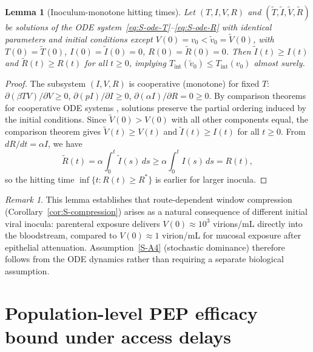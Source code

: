 \documentclass[12pt,a4paper]{article}
\theoremstyle{plain}
\newtheorem{lemma}{Lemma}
\theoremstyle{definition}
\theoremstyle{remark}
\newtheorem{remark}{Remark}
\begin{document}
\begin{lemma}[Inoculum-monotone hitting times]\label{lem:S-inoculum}
Let $(T, I, V, R)$ and $(\tilde{T}, \tilde{I}, \tilde{V}, \tilde{R})$ be solutions of the ODE system~\eqref{eq:S-ode-T}--\eqref{eq:S-ode-R} with identical parameters and initial conditions except $V(0) = v_0 < \tilde{v}_0 = \tilde{V}(0)$, with $T(0) = \tilde{T}(0)$, $I(0) = \tilde{I}(0) = 0$, $R(0) = \tilde{R}(0) = 0$. Then $\tilde{I}(t) \geq I(t)$ and $\tilde{R}(t) \geq R(t)$ for all $t \geq 0$, implying $T_{\mathrm{int}}(\tilde{v}_0) \leq T_{\mathrm{int}}(v_0)$ almost surely.
\end{lemma}

\begin{proof}
The subsystem $(I, V, R)$ is cooperative (monotone) for fixed $T$: $\partial(\beta T V)/\partial V \geq 0$, $\partial(pI)/\partial I \geq 0$, $\partial(\alpha I)/\partial R = 0 \geq 0$. By comparison theorems for cooperative ODE systems \cite{ref:Smith1995}, solutions preserve the partial ordering induced by the initial conditions. Since $\tilde{V}(0) > V(0)$ with all other components equal, the comparison theorem gives $\tilde{V}(t) \geq V(t)$ and $\tilde{I}(t) \geq I(t)$ for all $t \geq 0$. From $dR/dt = \alpha I$, we have
\[
    \tilde{R}(t) = \alpha \int_0^t \tilde{I}(s)\,ds \geq \alpha \int_0^t I(s)\,ds = R(t),
\]
so the hitting time $\inf\{t : R(t) \geq R^*\}$ is earlier for larger inocula.
\end{proof}

\begin{remark}
This lemma establishes that route-dependent window compression (Corollary~\ref{cor:S-compression}) arises as a natural consequence of different initial viral inocula: parenteral exposure delivers $V(0) \approx 10^3$ virions/mL directly into the bloodstream, compared to $V(0) \approx 1$ virion/mL for mucosal exposure after epithelial attenuation. Assumption~\ref{S-A4} (stochastic dominance) therefore follows from the ODE dynamics rather than requiring a separate biological assumption.
\end{remark}


\section{Population-level PEP efficacy bound under access delays}\label{sec:S6}
\setcounter{theorem}{0}
\setcounter{definition}{0}
\setcounter{proposition}{0}
\end{document}
